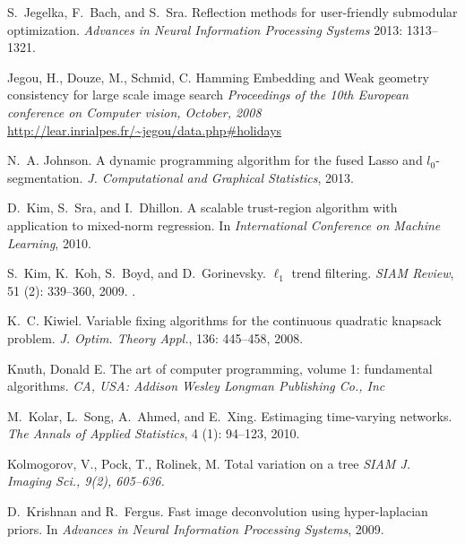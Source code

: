 \documentclass[twoside,11pt]{article}
\numberwithin{equation}{section}
\numberwithin{theorem}{section}
\begin{document}
\begin{thebibliography}{86}
S.~Jegelka, F.~Bach, and S.~Sra.
\newblock Reflection methods for user-friendly submodular optimization.
\newblock \emph{Advances in Neural Information Processing Systems} 2013: 1313--1321.

Jegou, H., Douze, M., Schmid, C.
\newblock Hamming Embedding and Weak geometry consistency for large scale image search
\newblock \emph{Proceedings of the 10th European conference on Computer vision, October, 2008}
\newblock \url{http://lear.inrialpes.fr/~jegou/data.php#holidays}

N.~A. Johnson.
\newblock A dynamic programming algorithm for the fused {L}asso and
  $l_0$-segmentation.
\newblock \emph{J. Computational and Graphical Statistics}, 2013.

D.~Kim, S.~Sra, and I.~Dhillon.
\newblock A scalable trust-region algorithm with application to mixed-norm
  regression.
\newblock In \emph{International Conference on Machine Learning}, 2010.

S.~Kim, K.~Koh, S.~Boyd, and D.~Gorinevsky.
\newblock $\ell_1$ trend filtering.
\newblock \emph{SIAM Review}, 51 (2): 339--360, 2009.
\newblock {}.

K.~C. Kiwiel.
\newblock Variable fixing algorithms for the continuous quadratic knapsack
  problem.
\newblock \emph{J. Optim. Theory Appl.}, 136: 445--458, 2008.

Knuth, Donald E.
\newblock The art of computer programming, volume 1: fundamental algorithms.
\newblock \emph{CA, USA: Addison Wesley Longman Publishing Co., Inc}

M.~Kolar, L.~Song, A.~Ahmed, and E.~Xing.
\newblock Estimaging time-varying networks.
\newblock \emph{The Annals of Applied Statistics}, 4 (1):
  94--123, 2010.

Kolmogorov, V., Pock, T., Rolinek, M.
\newblock Total variation on a tree
\newblock \emph{SIAM J. Imaging Sci., 9(2), 605–636.}

D.~Krishnan and R.~Fergus.
\newblock Fast image deconvolution using hyper-laplacian priors.
\newblock In \emph{Advances in Neural Information Processing Systems}, 2009.


\end{thebibliography}
\end{document}
